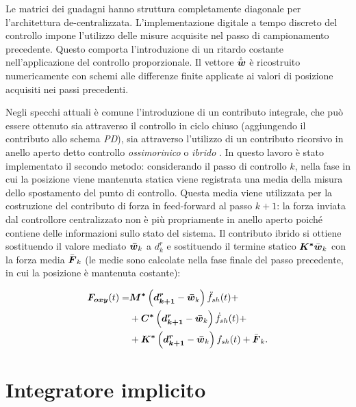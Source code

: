 Le matrici dei guadagni hanno struttura completamente diagonale per l'architettura de-centralizzata. L'implementazione digitale a tempo discreto del controllo impone l'utilizzo delle misure acquisite nel passo di campionamento precedente. Questo comporta l'introduzione di un ritardo costante nell'applicazione del controllo proporzionale. Il vettore $\dot{\tilde{\boldsymbol{w}}}$ è ricostruito numericamente con schemi alle differenze finite applicate ai valori di posizione acquisiti nei passi precedenti.

Negli specchi attuali è comune l'introduzione di un contributo integrale, che può essere ottenuto sia attraverso il controllo in ciclo chiuso (aggiungendo il contributo allo schema \textit{PD}), sia attraverso l'utilizzo di un contributo ricorsivo in anello aperto detto controllo \textit{ossimorinico} o \textit{ibrido} \citep{manetti_self-tuning_2014}. In questo lavoro è stato implementato il secondo metodo: considerando il passo di controllo $k$, nella fase in cui la posizione viene mantenuta statica viene registrata una media della misura dello spostamento del punto di controllo. Questa media viene utilizzata per la costruzione del contributo di forza in feed-forward al passo $k+1$: la forza inviata dal controllore centralizzato non è più propriamente in anello aperto poiché contiene delle informazioni sullo stato del sistema. Il contributo ibrido si ottiene sostituendo il valore mediato $\boldsymbol{\bar{w}}_k$ a $d^r_k$ e sostituendo il termine statico $\boldsymbol{K^*}\bar{\boldsymbol{w}}_k$ con la forza media $\bar{\boldsymbol{F}}_k$ (le medie sono calcolate nella fase finale del passo precedente, in cui la posizione è mantenuta costante):

\begin{align}
\label{eq:7foxy}
\boldsymbol{F_{oxy}}(t) =& \boldsymbol{M^*}\left(\boldsymbol{d_{k+1}^r} -\boldsymbol{\bar{w}}_k\right)\ddot{f}_{sh}(t)+\nonumber\\
&+\boldsymbol{C^*}\left(\boldsymbol{d_{k+1}^r} -\boldsymbol{\bar{w}}_k\right)\dot{f}_{sh}(t)+\nonumber\\
&+\boldsymbol{K^*}\left(\boldsymbol{d_{k+1}^r} -\boldsymbol{\bar{w}}_k\right)f_{sh}(t)+\bar{\boldsymbol{F}}_k.
\end{align}


\section{Integratore implicito}

